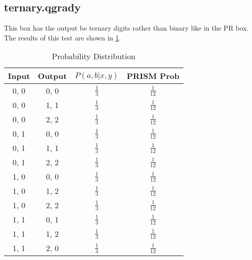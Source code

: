 \documentclass[report.tex]{subfiles}
\begin{document}
\subsection{ternary.qgrady} %
\label{sub:ternary_qgrady}
This box has the output be ternary digits rather than binary like in the PR box.
The results of this test are shown in \ref{tab:ternary_qgrady}.
\begin{table}[H]
  \centering
  \begin{tabular}{c | c | c | c}
    Input & Output & \(P(a, b | x, y)\) & PRISM Prob \\
    \hline
    0, 0 & 0, 0 & \(\frac{1}{3}\) & \(\frac{1}{12}\) \\
    0, 0 & 1, 1 & \(\frac{1}{3}\) & \(\frac{1}{12}\) \\
    0, 0 & 2, 2 & \(\frac{1}{3}\) & \(\frac{1}{12}\) \\
    0, 1 & 0, 0 & \(\frac{1}{3}\) & \(\frac{1}{12}\) \\
    0, 1 & 1, 1 & \(\frac{1}{3}\) & \(\frac{1}{12}\) \\
    0, 1 & 2, 2 & \(\frac{1}{3}\) & \(\frac{1}{12}\) \\
    1, 0 & 0, 0 & \(\frac{1}{3}\) & \(\frac{1}{12}\) \\
    1, 0 & 1, 2 & \(\frac{1}{3}\) & \(\frac{1}{12}\) \\
    1, 0 & 2, 2 & \(\frac{1}{3}\) & \(\frac{1}{12}\) \\
    1, 1 & 0, 1 & \(\frac{1}{3}\) & \(\frac{1}{12}\) \\
    1, 1 & 1, 2 & \(\frac{1}{3}\) & \(\frac{1}{12}\) \\
    1, 1 & 2, 0 & \(\frac{1}{3}\) & \(\frac{1}{12}\) \\
  \end{tabular}
  \caption{Probability Distribution}
  \label{tab:ternary_qgrady}
\end{table}
\end{document}
